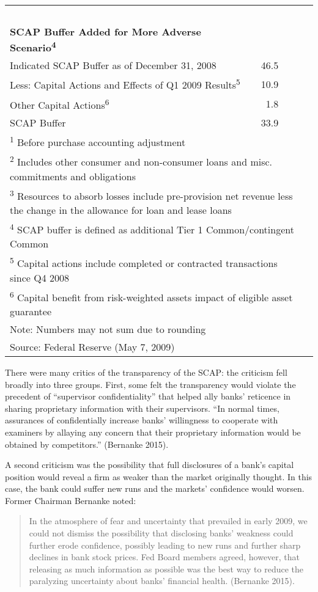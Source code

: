 \documentclass[justified, nobib]{tufte-handout2}
\begin{document}
\begin{table}[htbp]
\begin{longtable}[l]{@{\extracolsep{\fill}}@{}lr@{}rl@{}}
~ & ~ & ~\tabularnewline
\textbf{SCAP Buffer Added for More Adverse Scenario\textsuperscript{4}} & ~ & ~\tabularnewline
Indicated SCAP Buffer as of December 31, 2008 & 46.5 & ~\tabularnewline
\hspace{1em} Less: Capital Actions and Effects of Q1 2009 Results\textsuperscript{5}& 10.9 & ~\tabularnewline
\hspace{2em} Other Capital Actions\textsuperscript{6}& 1.8 & ~\tabularnewline
SCAP Buffer & 33.9 &~\tabularnewline
\bottomrule
\multicolumn{3}{l}{\footnotesize\textsuperscript{1} Before purchase accounting adjustment }\tabularnewline
\multicolumn{3}{l}{\footnotesize\textsuperscript{2} Includes other consumer and non-consumer loans and misc. commitments and obligations}\tabularnewline
\multicolumn{3}{l}{\footnotesize\textsuperscript{3} Resources to absorb losses include pre-provision net revenue less the change in the allowance for loan and lease loans}\tabularnewline
\multicolumn{3}{l}{\footnotesize\textsuperscript{4} SCAP buffer is defined as additional Tier 1 Common/contingent Common}\tabularnewline
\multicolumn{3}{l}{\footnotesize\textsuperscript{5} Capital actions include completed or contracted transactions since Q4 2008}\tabularnewline
\multicolumn{3}{l}{\footnotesize\textsuperscript{6} Capital benefit from risk-weighted assets impact of eligible asset guarantee}\tabularnewline
\multicolumn{3}{l}{\footnotesize Note: Numbers may not sum due to rounding}\tabularnewline
\multicolumn{3}{l}{\footnotesize Source: Federal Reserve (May 7, 2009)}\tabularnewline
\end{longtable}
\end{table}

There were many critics of the transparency of the SCAP: the criticism
fell broadly into three groups. First, some felt the transparency would
violate the precedent of ``supervisor confidentiality'' that helped ally
banks' reticence in sharing proprietary information with their
supervisors. ``In normal times, assurances of confidentially increase
banks' willingness to cooperate with examiners by allaying any concern
that their proprietary information would be obtained by competitors.''
(Bernanke 2015).

A second criticism was the possibility that full disclosures of a bank's
capital position would reveal a firm as weaker than the market
originally thought. In this case, the bank could suffer new runs and the
markets' confidence would worsen. Former Chairman Bernanke noted:

\begin{quote}
In the atmosphere of fear and uncertainty that prevailed in early 2009,
we could not dismiss the possibility that disclosing banks' weakness
could further erode confidence, possibly leading to new runs and further
sharp declines in bank stock prices. Fed Board members agreed, however,
that releasing as much information as possible was the best way to
reduce the paralyzing uncertainty about banks' financial health.
(Bernanke 2015).
\end{quote}
\end{document}
